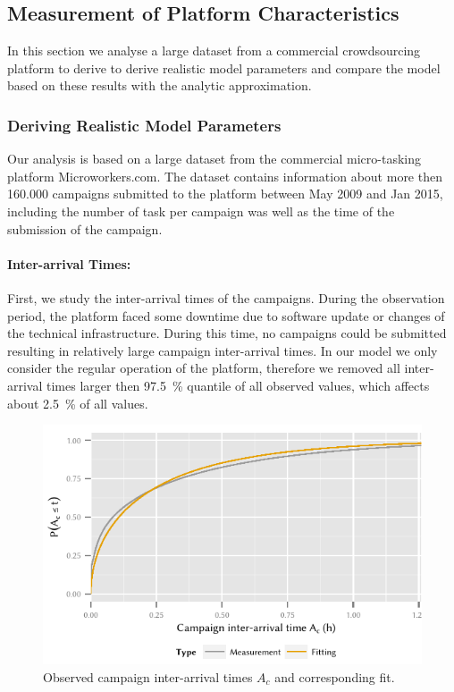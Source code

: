 \subsection{Measurement of Platform Characteristics}\label{sec:cloud:crowdsourcing:measurements}
In this section we analyse a large dataset from a commercial crowdsourcing platform to derive to derive realistic model parameters and compare the model based on these results with the analytic approximation.

\subsubsection*{Deriving Realistic Model Parameters}
Our analysis is based on a large dataset from the commercial micro-tasking platform Microworkers.com.
The dataset contains information about more then 160.000 campaigns submitted to the platform between May 2009 and Jan 2015, including the number of task per campaign was well as the time of the submission of the campaign.  

\paragraph*{Inter-arrival Times:} First, we study the inter-arrival times of the campaigns.
During the observation period, the platform faced some downtime due to software update or changes of the technical infrastructure.
During this time, no campaigns could be submitted resulting in relatively large campaign inter-arrival times.
In our model we only consider the regular operation of the platform, therefore we removed all inter-arrival times larger then \SI{97.5}{\percent} quantile of all observed values, which affects about \SI{2.5}{\percent} of all values.

\begin{figure}
  \centering
  \includegraphics{cloud/crowdsourcing/measurements/figures/campaign_interarrival}
  \caption{Observed campaign inter-arrival times \(A_c\) and corresponding fit.}
  \label{fig:cloud:crowdsourcing:measurements:parameters:campaign_interarrival}
\end{figure}

